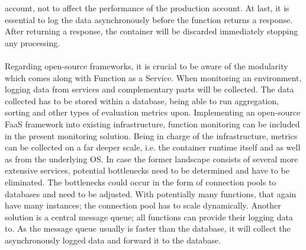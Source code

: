 \documentclass[a4paper,twoside,11pt, pagesize]{scrartcl}
\begin{document}
\begin{spacing}{1.2}
account, not to affect the performance of the production account. At last, it is essential to log the data asynchronously before the function returns a response. After returning a response, the container will be discarded immediately stopping any processing.\\\\ Regarding open-source frameworks, it is crucial to be aware of the modularity which comes along with Function as a Service. When monitoring an environment, logging data from services and complementary parts will be collected. The data collected has to be stored within a database, being able to run aggregation, sorting and other types of evaluation metrics upon. Implementing an open-source FaaS framework into existing infrastructure, function monitoring can be included in the present monitoring solution. Being in charge of the infrastructure, metrics can be collected on a far deeper scale, i.e. the container runtime itself and as well as from the underlying OS. In case the former landscape consists of several more extensive services, potential bottlenecks need to be determined and have to be eliminated. The bottlenecks could occur in the form of connection pools to databases and need to be adjusted. With potentially many functions, that again have many instances; the connection pool has to scale dynamically. Another solution is a central message queue; all functions can provide their logging data to. As the message queue usually is faster than the database, it will collect the asynchronously logged data and forward it to the database.

\end{spacing}
\end{document}
